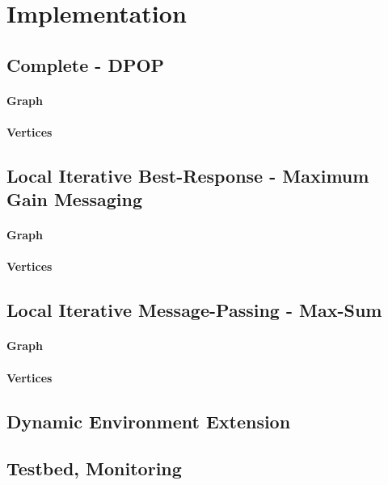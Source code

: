 \chapter{Implementation}

\section{Complete - DPOP}
\subsubsection{Graph}
\subsubsection{Vertices}

\section{Local Iterative Best-Response - Maximum Gain Messaging}
\subsubsection{Graph}
\subsubsection{Vertices}

\section{Local Iterative Message-Passing - Max-Sum}
\subsubsection{Graph}
\subsubsection{Vertices}

\section{Dynamic Environment Extension}
\section{Testbed, Monitoring}


